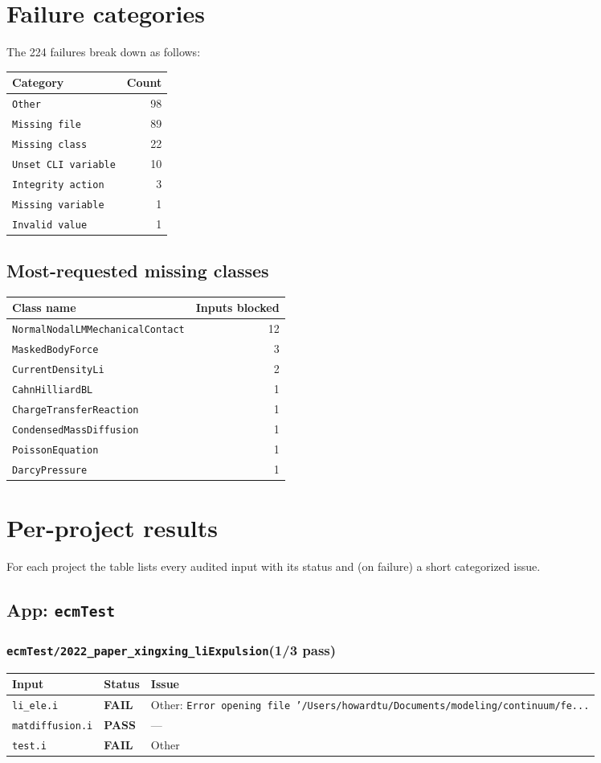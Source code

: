 \documentclass[10pt,letterpaper]{article}
\newcommand{\PASS}{\textcolor{passgreen}{\textbf{PASS}}}
\newcommand{\FAIL}{\textcolor{failred}{\textbf{FAIL}}}
\newcommand{\code}[1]{\texttt{\small #1}}
\begin{document}
\section{Failure categories}
The 224 failures break down as follows:
\begin{longtable}{lr}
\toprule
Category & Count \\
\midrule
\endhead
\code{Other} & 98 \\
\code{Missing file} & 89 \\
\code{Missing class} & 22 \\
\code{Unset CLI variable} & 10 \\
\code{Integrity action} & 3 \\
\code{Missing variable} & 1 \\
\code{Invalid value} & 1 \\
\bottomrule
\end{longtable}
\subsection{Most-requested missing classes}
\begin{tabular}{lr}
\toprule
Class name & Inputs blocked \\
\midrule
\code{NormalNodalLMMechanicalContact} & 12 \\
\code{MaskedBodyForce} & 3 \\
\code{CurrentDensityLi} & 2 \\
\code{CahnHilliardBL} & 1 \\
\code{ChargeTransferReaction} & 1 \\
\code{CondensedMassDiffusion} & 1 \\
\code{PoissonEquation} & 1 \\
\code{DarcyPressure} & 1 \\
\bottomrule
\end{tabular}

\section{Per-project results}
For each project the table lists every audited input with its status and (on failure) a short categorized issue.

\subsection{App: \code{ecmTest}}
\subsubsection{\code{ecmTest/2022\_paper\_xingxing\_liExpulsion}\hfill (1/3 pass)}
\begin{longtable}{p{} l p{}}
\toprule
Input & Status & Issue \\
\midrule
\endhead
\code{li\_ele.i} & \FAIL & Other: \code{Error opening file '/Users/howardtu/Documents/modeling/continuum/fe...} \\
\code{matdiffusion.i} & \PASS & --- \\
\code{test.i} & \FAIL & Other \\
\bottomrule
\end{longtable}
\end{document}
